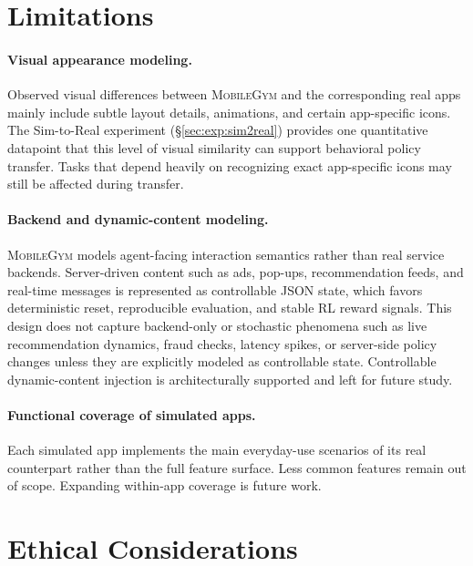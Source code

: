 \documentclass[11pt]{article}
\newcommand{\sys}{\textsc{MobileGym}}
\begin{document}
\section*{Limitations}

\paragraph{Visual appearance modeling.} Observed visual differences between \sys{} and the corresponding real apps mainly include subtle layout details, animations, and certain app-specific icons. The Sim-to-Real experiment (§\ref{sec:exp:sim2real}) provides one quantitative datapoint that this level of visual similarity can support behavioral policy transfer. Tasks that depend heavily on recognizing exact app-specific icons may still be affected during transfer.

\paragraph{Backend and dynamic-content modeling.} \sys{} models agent-facing interaction semantics rather than real service backends. Server-driven content such as ads, pop-ups, recommendation feeds, and real-time messages is represented as controllable JSON state, which favors deterministic reset, reproducible evaluation, and stable RL reward signals. This design does not capture backend-only or stochastic phenomena such as live recommendation dynamics, fraud checks, latency spikes, or server-side policy changes unless they are explicitly modeled as controllable state. Controllable dynamic-content injection is architecturally supported and left for future study.

\paragraph{Functional coverage of simulated apps.} Each simulated app implements the main everyday-use scenarios of its real counterpart rather than the full feature surface. Less common features remain out of scope. Expanding within-app coverage is future work.



\section*{Ethical Considerations}
\end{document}
